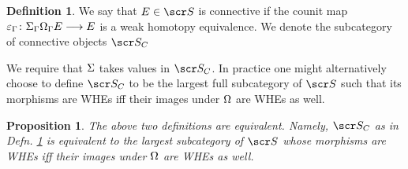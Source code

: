 \documentclass{amsart}
\newtheorem{prop}{Proposition}[section]
\theoremstyle{definition}
\newtheorem{defn}{Definition}[section]
\begin{document}
\begin{defn}\label{defn:0.1}
We say that $E \in \sS$ is connective if the counit map $\varepsilon_{\Gamma} \colon \Sigma_{\Gamma} \Omega_{\Gamma} E \longrightarrow E$ is a weak homotopy equivalence. We denote the subcategory of connective objects $\sS_C$
\end{defn}

We require that $\Sigma$ takes values in $\sS_C$. In practice one might alternatively choose to define $\sS_C$ to be the largest full subcategory of $\sS$ such that its morphisms are WHEs iff their images under $\Omega$ are WHEs as well.

\begin{prop}
The above two definitions are equivalent. Namely, $\sS_C$ as in Defn. \ref{defn:0.1} is equivalent to the largest subcategory of $\sS$ whose morphisms are WHEs iff their images under $\Omega$ are WHEs as well.
\end{prop}
\end{document}
